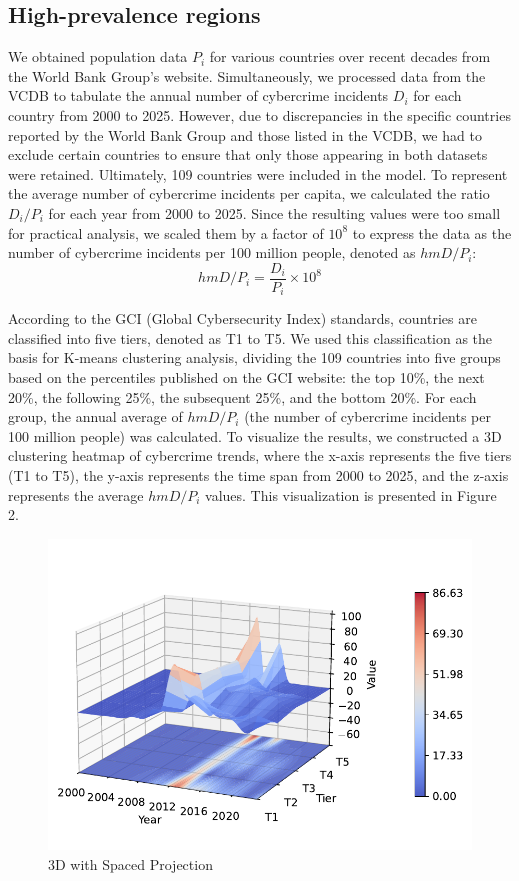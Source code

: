 \subsection{High-prevalence regions}\label{subsec:high-prevalence-regions} %
	We obtained population data $P_i$ for various countries over recent decades from the World Bank Group's website\cite{population}.
	Simultaneously, we processed data from the VCDB to tabulate the annual number of cybercrime incidents $D_i$ for each country from 2000 to 2025.
	However, due to discrepancies in the specific countries reported by the World Bank Group and those listed in the VCDB,
	we had to exclude certain countries to ensure that only those appearing in both datasets were retained.
	Ultimately, 109 countries were included in the model.
	To represent the average number of cybercrime incidents per capita,
	we calculated the ratio $D_i/P_i$ for each year from 2000 to 2025.
	Since the resulting values were too small for practical analysis,
	we scaled them by a factor of $10^{8}$ to express the data as the number of cybercrime incidents per 100 million people,
	denoted as $hmD/P_i$:
	\[ hmD/P_i = \frac{D_i}{P_i} \times 10^{8} \]

	According to the GCI (Global Cybersecurity Index) standards, countries are classified into five tiers, denoted as T1 to T5.
	We used this classification as the basis for K-means clustering analysis,
	dividing the 109 countries into five groups based on the percentiles published on the GCI website:
	the top 10\%, the next 20\%, the following 25\%, the subsequent 25\%, and the bottom 20\%.
	For each group, the annual average of $hmD/P_i$ (the number of cybercrime incidents per 100 million people) was calculated.
	To visualize the results, we constructed a 3D clustering heatmap of cybercrime trends,
	where the x-axis represents the five tiers (T1 to T5),
	the y-axis represents the time span from 2000 to 2025,
	and the z-axis represents the average $hmD/P_i$ values.
	This visualization is presented in Figure 2.
	\begin{figure}[htbp]
		\centering
		\includegraphics[width=0.8\linewidth]{../rsrc/3D_with_Spaced_Projection}
		\caption{3D with Spaced Projection}\label{fig:3D_with_Spaced_Projection}
	\end{figure}
